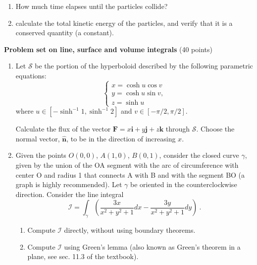 \documentclass[fleqn]{article}
\begin{document}
\begin{enumerate}
\begin{enumerate}
        \item How much time elapses until the particles collide?  
    
        \item calculate the total kinetic energy of the particles, and verify that it is a conserved quantity (a constant).  
        \end{enumerate}
    
  \end{enumerate}

  \pagebreak

  \textbf{Problem set on line, surface and volume integrals} (40 points)
  \begin{enumerate}

    \item Let ${\mathcal S}$ be the portion of the hyperboloid 
    described by the following parametric equations:
    \begin{equation} 
      \begin{cases} 
      x = \cosh u \cos v  \nonumber \\
      y = \cosh u \sin v,  \nonumber \\
      z = \sinh u  \nonumber 
      \end{cases}
    \end{equation} 
    where $u \in \left[-\sinh^{-1} 1, \sinh^{-1} 2 \right]$ and $v \in \left[-\pi/2, \pi/2 \right]$. 
    
    Calculate the flux of the vector $\mathbf{F} = x\mathbf{i }+ y\mathbf{j }+ z\mathbf{k}$ through ${\mathcal S}$. Choose the normal vector, $\mathbf{\hat{n}}$, to be in the direction of increasing $x$.
    
    \item Given the points $O (0, 0)$, $A (1, 0)$, $B (0, 1)$, consider the closed curve $\gamma$, given by the union of the OA segment
    with the arc of circumference with center O and radius 1 that connects A with B and with the segment BO (a graph is highly recommended). Let $\gamma$ be oriented in the 
    counterclockwise direction. Consider the line integral
    $${\mathcal I} = \int_{\gamma} \left(\frac{3x}{x^2 + y^2 +1} dx-\frac{3y}{x^2 + y^2 +1} dy
       \right)~.
       $$
      \begin{enumerate}
        \item Compute  ${\mathcal I}$ directly, without using boundary theorems. 
        
        \item Compute  ${\mathcal I}$ using Green's lemma (also known as Green's theorem in a plane, see sec. 11.3 of the textbook). 
      \end{enumerate}
    

\end{enumerate}
\end{document}
